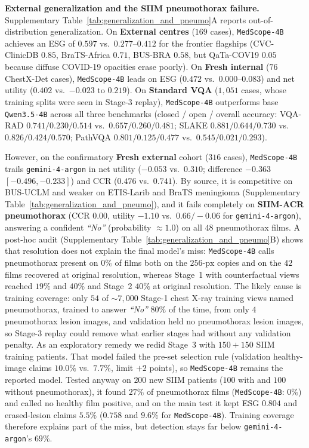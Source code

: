\documentclass[journal]{IEEEtran}
\begin{document}
\textbf{External generalization and the SIIM pneumothorax failure.} Supplementary Table~\ref{tab:generalization_and_pneumo}A reports out-of-distribution generalization. On \textbf{External centres} ($169$ cases), \texttt{MedScope-4B} achieves an ESG of $0.597$ vs.\ $0.277\text{--}0.412$ for the frontier flagships (CVC-ClinicDB $0.85$, BraTS-Africa $0.71$, BUS-BRA $0.58$, but QaTa-COV19 $0.05$ because diffuse COVID-19 opacities erase poorly). On \textbf{Fresh internal} ($76$ ChestX-Det cases), \texttt{MedScope-4B} leads on ESG ($0.472$ vs.\ $0.000\text{--}0.083$) and net utility ($0.402$ vs.\ $-0.023$ to $0.219$). On \textbf{Standard VQA} ($1,051$ cases, whose training splits were seen in Stage-3 replay), \texttt{MedScope-4B} outperforms base \texttt{Qwen3.5-4B} across all three benchmarks (closed / open / overall accuracy: VQA-RAD $0.741 / 0.230 / 0.514$ vs.\ $0.657 / 0.260 / 0.481$; SLAKE $0.881 / 0.644 / 0.730$ vs.\ $0.826 / 0.424 / 0.570$; PathVQA $0.801 / 0.125 / 0.477$ vs.\ $0.545 / 0.021 / 0.293$).

However, on the confirmatory \textbf{Fresh external} cohort ($316$ cases), \texttt{MedScope-4B} trails \texttt{gemini-4-argon} in net utility ($-0.053$ vs.\ $0.310$; difference $-0.363$ $[-0.496, -0.233]$) and CCR ($0.476$ vs.\ $0.741$). By source, it is competitive on BUS-UCLM and weaker on ETIS-Larib and BraTS meningioma (Supplementary Table~\ref{tab:generalization_and_pneumo}), and it fails completely on \textbf{SIIM-ACR pneumothorax} ($\text{CCR } 0.00$, utility $-1.10$ vs.\ $0.66 / -0.06$ for \texttt{gemini-4-argon}), answering a confident \emph{``No''} (probability $\approx 1.0$) on all $48$ pneumothorax films. A post-hoc audit (Supplementary Table~\ref{tab:generalization_and_pneumo}B) shows that resolution does not explain the final model's miss: \texttt{MedScope-4B} calls pneumothorax present on $0\%$ of films both on the $256\text{-px}$ copies and on the $42$ films recovered at original resolution, whereas Stage~1 with counterfactual views reached $19\%$ and $40\%$ and Stage~2 $40\%$ at original resolution. The likely cause is training coverage: only $54$ of $\sim 7{,}000$ Stage-1 chest X-ray training views named pneumothorax, trained to answer \emph{``No''} $80\%$ of the time, from only $4$ pneumothorax lesion images, and validation held no pneumothorax lesion images, so Stage-3 replay could remove what earlier stages had without any validation penalty. As an exploratory remedy we redid Stage~3 with $150 + 150$ SIIM training patients. That model failed the pre-set selection rule (validation healthy-image claims $10.0\%$ vs.\ $7.7\%$, limit $+2$ points), so \texttt{MedScope-4B} remains the reported model. Tested anyway on $200$ new SIIM patients ($100$ with and $100$ without pneumothorax), it found $27\%$ of pneumothorax films (\texttt{MedScope-4B}: $0\%$) and called no healthy film positive, and on the main test it kept ESG $0.804$ and erased-lesion claims $5.5\%$ ($0.758$ and $9.6\%$ for \texttt{MedScope-4B}). Training coverage therefore explains part of the miss, but detection stays far below \texttt{gemini-4-argon}'s $69\%$.
\end{document}
